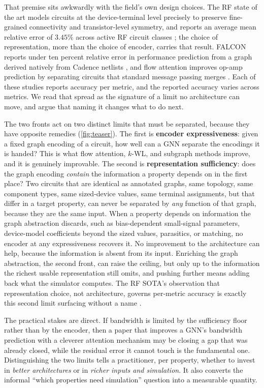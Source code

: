 \documentclass[10pt]{article}
\begin{document}
That premise sits awkwardly with the field's own design choices. The RF state of the art models circuits at the device-terminal level precisely to preserve fine-grained connectivity and transistor-level symmetry, and reports an average mean relative error of $3.45\%$ across active RF circuit classes \citep{asadi2025rfinformed}; the choice of representation, more than the choice of encoder, carries that result. FALCON reports under ten percent relative error in performance prediction from a graph derived natively from Cadence netlists \citep{mehradfar2025falcon}, and flow attention improves op-amp prediction by separating circuits that standard message passing merges \citep{plettenberg2025flow}. Each of these studies reports accuracy per metric, and the reported accuracy varies across metrics. We read that spread as the signature of a limit no architecture can move, and argue that naming it changes what to do next.

The two fronts act on two distinct limits that must be separated, because they have opposite remedies (\cref{fig:teaser}). The first is \textbf{encoder expressiveness}: given a fixed graph encoding of a circuit, how well can a GNN separate the encodings it is handed? This is what flow attention, $k$-WL, and subgraph methods improve, and it is genuinely improvable. The second is \textbf{representation sufficiency}: does the graph encoding \emph{contain} the information a property depends on in the first place? Two circuits that are identical as annotated graphs, same topology, same component types, same sized-device values, same terminal assignments, but that differ in a target property, can never be separated by \emph{any} function of that graph, because they are the same input. When a property depends on information the graph abstraction discards, such as bias-dependent small-signal parameters, device-model coefficients beyond the sized values, parasitics, or matching, no encoder at any expressiveness recovers it. No improvement to the architecture can help, because the information is absent from its input. Enriching the graph abstraction, the second front, can raise the ceiling, but only up to the information the richest usable representation still omits, and pushing further means adding back what the simulator computes. The RF SOTA's observation that representation choice, not architecture, governs per-metric accuracy is exactly this second limit surfacing without a name \citep{asadi2025rfinformed}.

The practical stakes are direct. If bandwidth is limited by the sufficiency floor rather than by the encoder, then a paper that improves a GNN's bandwidth prediction with a cleverer attention mechanism may be closing a gap that was already closed, while the residual error it cannot touch is the fundamental one. Distinguishing the two limits tells a practitioner, per property, whether to invest in \emph{better architectures} or in \emph{richer inputs and simulation}. It also converts the informal ``which properties need simulation'' question into a measurable quantity.
\end{document}

